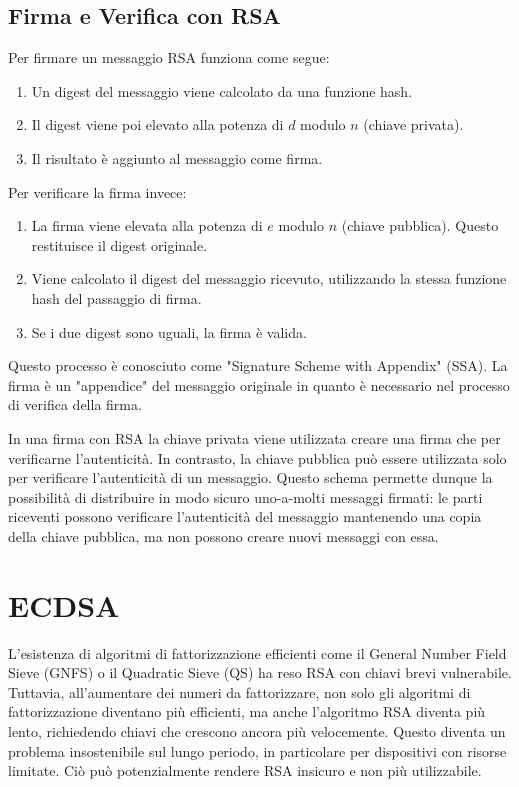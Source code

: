 \documentclass{article}
\begin{document}
\subsection{Firma e Verifica con RSA}
Per firmare un messaggio RSA funziona come segue:
\begin{enumerate}
	\item Un digest del messaggio viene calcolato da una funzione hash.
	\item Il digest viene poi elevato alla potenza di $d$ modulo $n$ (chiave privata).
	\item Il risultato è aggiunto al messaggio come firma.
\end{enumerate}
Per verificare la firma invece:
\begin{enumerate}
	\item La firma viene elevata alla potenza di $e$ modulo $n$ (chiave pubblica). Questo restituisce il digest originale.
	\item Viene calcolato il digest del messaggio ricevuto, utilizzando la stessa funzione hash del passaggio di firma.
	\item Se i due digest sono uguali, la firma è valida.
\end{enumerate}

Questo processo è conosciuto come "Signature Scheme with Appendix" (SSA).
La firma è un "appendice" del messaggio originale in quanto è necessario nel processo di verifica della firma.

In una firma con RSA la chiave privata viene utilizzata creare una firma che per verificarne l'autenticità.
In contrasto, la chiave pubblica può essere utilizzata solo per verificare l'autenticità di un messaggio.
Questo schema permette dunque la possibilità di distribuire in modo sicuro uno-a-molti messaggi firmati: le parti riceventi possono verificare l'autenticità del messaggio mantenendo una copia della chiave pubblica, ma non possono creare nuovi messaggi con essa.

\section{ECDSA}
L'esistenza di algoritmi di fattorizzazione efficienti come il General Number Field Sieve (GNFS) o il Quadratic Sieve (QS) ha reso RSA con chiavi brevi vulnerabile.
Tuttavia, all'aumentare dei numeri da fattorizzare, non solo gli algoritmi di fattorizzazione diventano più efficienti, ma anche l'algoritmo RSA diventa più lento, richiedendo chiavi che crescono ancora più velocemente.
Questo diventa un problema insostenibile sul lungo periodo, in particolare per dispositivi con risorse limitate.
Ciò può potenzialmente rendere RSA insicuro e non più utilizzabile.
\end{document}
